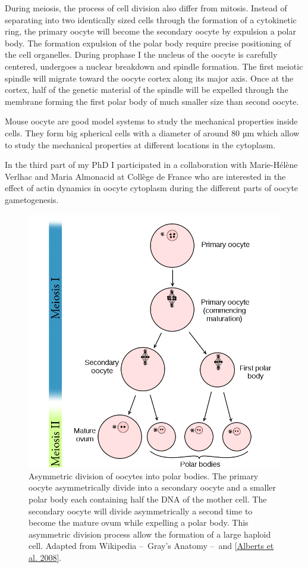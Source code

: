 \documentclass[A4paperpaper,11pt,english]{sphinxmanual}
\begin{document}
During meiosis, the process of cell division also differ from mitosis. Instead
of separating into two identically sized cells through the formation of a
cytokinetic ring, the primary oocyte will become the secondary oocyte by
expulsion a polar body. The formation expulsion of the polar body require
precise positioning of the cell organelles. During prophase I the nucleus of
the oocyte is carefully centered, undergoes a nuclear breakdown and spindle formation.
The first meiotic spindle will migrate toward the oocyte cortex along
its major axis. Once at the cortex, half of the genetic material of the spindle
will be expelled through the membrane forming the first polar body of much
smaller size than second oocyte.

Mouse oocyte are good model systems to study the mechanical properties inside
cells. They form big spherical cells with a diameter of around 80 µm
which allow to study the mechanical properties at different locations in
the cytoplasm.

In the third part of my PhD I participated in a collaboration with Marie-Hélène
Verlhac and Maria Almonacid at Collège de France who are interested in the
effect of actin dynamics in oocyte cytoplasm during the different parts of
oocyte gametogenesis.
\begin{figure}[htbp]
\centering
\capstart

\includegraphics[width=0.800\linewidth]{oocyte-polar.png}
\caption{Asymmetric division of oocytes into polar bodies. The primary oocyte
asymmetrically divide into a secondary oocyte and a smaller polar body each
containing half the DNA of the mother cell. The secondary oocyte will
divide asymmetrically a second time to become the mature ovum while
expelling a polar body. This asymmetric division process allow the
formation of a large haploid cell. Adapted from Wikipedia – Gray's
Anatomy – and {\hyperref[index-latex:alberts2008]{{[}Alberts et al. 2008{]}}}.}\label{index-latex:fig-asymetric-division}\end{figure}
\end{document}
